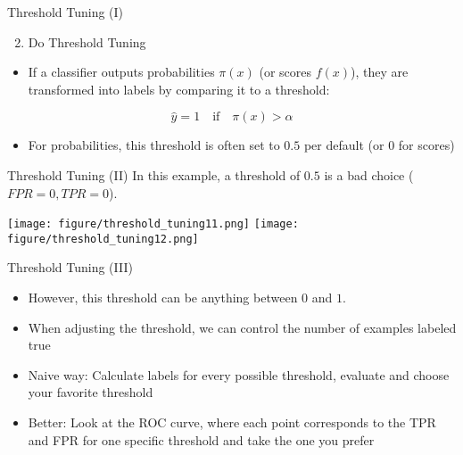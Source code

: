 \documentclass[11pt,compress,t,notes=noshow, aspectratio=169, xcolor=table]{beamer}
\begin{document}
\begin{frame}{Threshold Tuning (I)}
\label{threshold-tuning-i}
\begin{enumerate}
\setcounter{enumi}{1}
\tightlist
\item
  Do Threshold Tuning
\end{enumerate}

\begin{itemize}
\tightlist
\item
  If a classifier outputs probabilities \(\pi (x)\) (or scores
  \(f(x)\)), they are transformed into labels by comparing it to a
  threshold:
\end{itemize}

\[
\hat y = 1 \quad \text{if} \quad \pi (x) > \alpha
\]

\begin{itemize}
\tightlist
\item
  For probabilities, this threshold is often set to \(0.5\) per default
  (or \(0\) for scores)
\end{itemize}
\end{frame}

\begin{frame}{Threshold Tuning (II)}
\label{threshold-tuning-ii}
In this example, a threshold of \(0.5\) is a bad choice
(\(FPR = 0, TPR = 0\)).

\begin{center}
\texttt{[image: figure/threshold\_tuning11.png]}
\texttt{[image: figure/threshold\_tuning12.png]}
\end{center}
\end{frame}

\begin{frame}{Threshold Tuning (III)}
\label{threshold-tuning-iii}
\begin{itemize}
\tightlist
\item
  However, this threshold can be anything between \(0\) and \(1\).
\item
  When adjusting the threshold, we can control the number of examples
  labeled true
\item
  Naive way: Calculate labels for every possible threshold, evaluate and
  choose your favorite threshold
\item
  Better: Look at the ROC curve, where each point corresponds to the TPR
  and FPR for one specific threshold and take the one you prefer
\end{itemize}
\end{frame}
\end{document}
